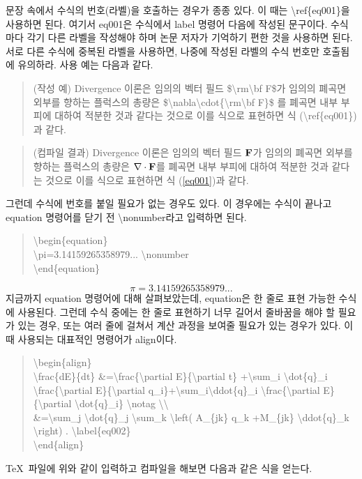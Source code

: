 \documentclass{gshs-report-v1.2}
\begin{document}
문장 속에서 수식의 번호(라벨)을 호출하는 경우가 종종 있다. 이 때는 {\textbackslash}ref\{eq001\}을 사용하면 된다. 여기서 eq001은 수식에서 label 명령어 다음에 작성된 문구이다. 수식마다 각기 다른 라벨을 작성해야 하며 논문 저자가 기억하기 편한 것을 사용하면 된다. 서로 다른 수식에 중복된 라벨을 사용하면, 나중에 작성된 라벨의 수식 번호만 호출됨에 유의하라. 사용 예는 다음과 같다.
\begin{quote}
	(작성 예) Divergence 이론은 임의의 벡터 필드 \${\textbackslash}rm{\textbackslash}bf F\$가 임의의 폐곡면 외부를 향하는 플럭스의 총량은 \${\textbackslash}nabla{\textbackslash}cdot\{{\textbackslash}rm{\textbackslash}bf F\}\$ 를 폐곡면 내부 부피에 대하여 적분한 것과 같다는 것으로 이를 식으로 표현하면 식 ({\textbackslash}ref\{eq001\}) 과 같다.
\end{quote}
\begin{quote}
	(컴파일 결과) Divergence 이론은 임의의 벡터 필드 $\rm\bf F$가 임의의 폐곡면 외부를 향하는 플럭스의 총량은 $\nabla\cdot{\rm\bf F}$를 폐곡면 내부 부피에 대하여 적분한 것과 같다는 것으로 이를 식으로 표현하면 식 (\ref{eq001})과 같다.
\end{quote}
그런데 수식에 번호를 붙일 필요가 없는 경우도 있다. 이 경우에는 수식이 끝나고 equation 명령어를 닫기 전 {\textbackslash}nonumber라고 입력하면 된다.
\begin{quote}
	{\textbackslash}begin\{equation\}\\
	{\textbackslash}pi=3.14159265358979... {\textbackslash}nonumber \\
	{\textbackslash}end\{equation\}
\end{quote}
\begin{equation}
	\pi=3.14159265358979... \nonumber
\end{equation}
지금까지 equation 명령어에 대해 살펴보았는데, equation은 한 줄로 표현 가능한 수식에 사용된다. 그런데 수식 중에는 한 줄로 표현하기 너무 길어서 줄바꿈을 해야 할 필요가 있는 경우, 또는 여러 줄에 걸쳐서 계산 과정을 보여줄 필요가 있는 경우가 있다. 이 때 사용되는 대표적인 명령어가 align이다.
\begin{quote}
	{\textbackslash}begin\{align\} \\
	{\textbackslash}frac\{dE\}\{dt\} 
	\&={\textbackslash}frac\{{\textbackslash}partial 
	E\}\{{\textbackslash}partial t\} +{\textbackslash}sum\_i 
	{\textbackslash}dot\{q\}\_i 
	{\textbackslash}frac\{{\textbackslash}partial 
	E\}\linebreak\{{\textbackslash}partial 
	q\_i\}+{\textbackslash}sum\_i{\textbackslash}ddot\{q\}\_i 
	{\textbackslash}frac\{{\textbackslash}partial 
	E\}\{{\textbackslash}partial {\textbackslash}dot\{q\}\_i\} 
	{\textbackslash}notag {\textbackslash}{\textbackslash} \\
	\&={\textbackslash}sum\_j {\textbackslash}dot\{q\}\_j 
	{\textbackslash}sum\_k {\textbackslash}left( A\_\{jk\} q\_k +M\_\{jk\} 
	{\textbackslash}ddot\{q\}\_k {\textbackslash}right) . 
	{\textbackslash}label\{eq002\}\\
	{\textbackslash}end\{align\}
\end{quote}
\TeX\ 파일에 위와 같이 입력하고 컴파일을 해보면 다음과 같은 식을 얻는다.
\end{document}
